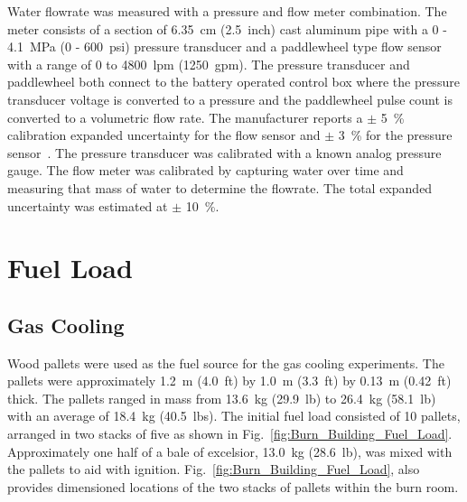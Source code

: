 \documentclass[12pt,oneside]{book}
\begin{document}
Water flowrate was measured with a pressure and flow meter combination. The meter consists of a section of 6.35~cm (2.5~inch) cast aluminum pipe with a 0 - 4.1~MPa (0 - 600~psi) pressure transducer and a paddlewheel type flow sensor with a range of 0 to 4800~lpm (1250~gpm). The pressure transducer and paddlewheel both connect to the battery operated control box where the pressure transducer voltage is converted to a pressure and the paddlewheel pulse count is converted to a volumetric flow rate.  The manufacturer reports a $\pm$ 5~\% calibration expanded uncertainty for the flow sensor and $\pm$ 3~\%  for the pressure sensor~\cite{Akron:2009}. The pressure transducer was calibrated with a known analog pressure gauge. The flow meter was calibrated by capturing water over time and measuring that mass of water to determine the flowrate. The total expanded uncertainty was estimated at $\pm$ 10~\%.

\section{Fuel Load}
\label{sec:fuel_load}

\subsection{Gas Cooling}
\label{sec:Fuel_Load_Gas_Cooling}

Wood pallets were used as the fuel source for the gas cooling experiments. The pallets were approximately 1.2~m (4.0~ft) by 1.0~m (3.3~ft) by 0.13~m (0.42~ft) thick. The pallets ranged in mass from 13.6~kg (29.9~lb) to 26.4~kg (58.1~lb) with an average of 18.4~kg (40.5~lbs). The initial fuel load consisted of 10 pallets, arranged in two stacks of five as shown in Fig.~\ref{fig:Burn_Building_Fuel_Load}. Approximately one half of a bale of excelsior, 13.0~kg (28.6~lb), was mixed with the pallets to aid with ignition. Fig.~\ref{fig:Burn_Building_Fuel_Load}, also provides dimensioned locations of the two stacks of pallets within the burn room.
\end{document}
